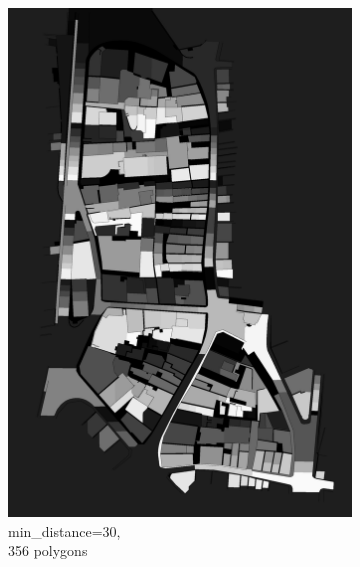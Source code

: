 \documentclass[12pt]{article}
\begin{document}
\begin{figure}[H]
\begin{subfigure}[b]{.3\textwidth}
		\includegraphics[width=1\linewidth]{images/polygon_recovery/watershed1_distance30_b356.png}  
	   	\caption{min\_distance=30, \\ 356 polygons}
	\end{subfigure}
	\begin{subfigure}[b]{.3\textwidth}
		\centering

\end{subfigure}
\end{figure}
\end{document}
